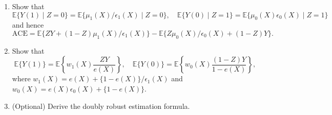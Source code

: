 \documentclass[11pt]{article}
\begin{document}
\begin{enumerate}[label=(\alph*)]

\item Show that
\[
\mathbb{E}\{Y(1) \mid Z = 0\} = \mathbb{E}\{\mu_1(X) / \epsilon_1(X) \mid Z = 0\}, \quad
\mathbb{E}\{Y(0) \mid Z = 1\} = \mathbb{E}\{\mu_0(X) \epsilon_0(X) \mid Z = 1\}
\]
and hence
\[
\mathrm{ACE} = \mathbb{E}\{Z Y + (1-Z)\mu_1(X)/\epsilon_1(X)\} - \mathbb{E}\{Z\mu_0(X)/\epsilon_0(X) + (1-Z)Y\}.
\]

\item Show that
\[
\mathbb{E}\{Y(1)\} = \mathbb{E}\left\{w_1(X) \frac{ZY}{e(X)}\right\}, \quad
\mathbb{E}\{Y(0)\} = \mathbb{E}\left\{w_0(X) \frac{(1-Z)Y}{1-e(X)}\right\},
\]
where $w_1(X) = e(X) + \{1-e(X)\}/\epsilon_1(X)$ and $w_0(X) = e(X)\epsilon_0(X) + \{1-e(X)\}$.

\item (Optional) Derive the doubly robust estimation formula.

\end{enumerate}
\end{document}
